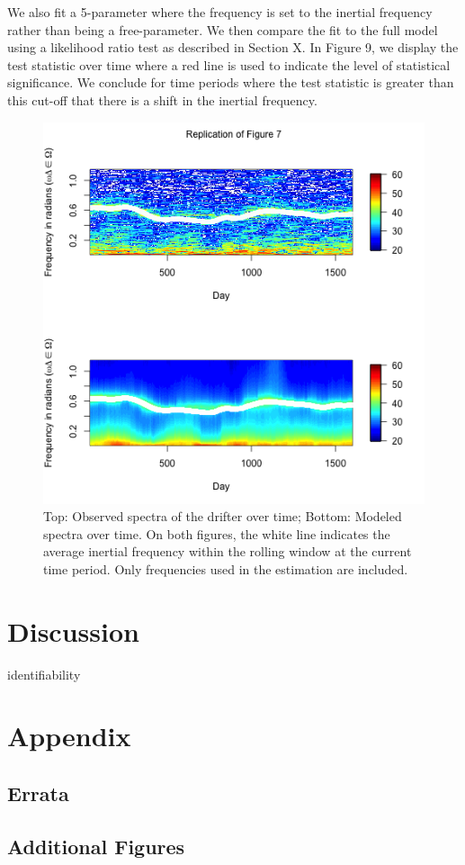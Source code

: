 \documentclass{stat572Style}
\begin{document}
We also fit a 5-parameter where the frequency is set to the inertial frequency rather than being a free-parameter. We then compare the fit to the full model using a likelihood ratio test as described in Section X. In Figure 9, we display the test statistic over time where a red line is used to indicate the level of statistical significance. We conclude for time periods where the test statistic is greater than this cut-off that there is a shift in the inertial frequency. 


\begin{figure}[hb]
	\label{fig:timeVarying}
  \centering
    \includegraphics[width=.5\textwidth]{fig7.png}
        \caption{Top: Observed spectra of the drifter over time; Bottom: Modeled spectra over time. On both figures, the white line indicates the average inertial frequency within the rolling window at the current time period.  Only frequencies used in the estimation are included.  }
\end{figure}

\section{Discussion}
identifiability 



\clearpage




\section{Appendix}

\subsection{Errata}

\subsection{Additional Figures}
\end{document}
